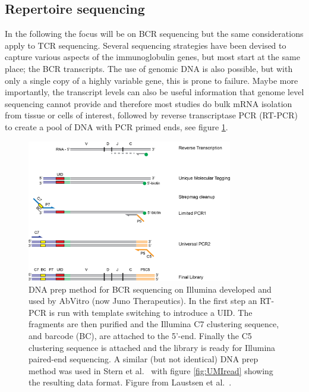 \subsection{Repertoire sequencing}
In the following the focus will be on BCR sequencing but the same considerations apply to TCR sequencing.
Several sequencing strategies have been devised to capture various aspects of the immunoglobulin genes, but most start at the same place; the BCR transcripts.
The use of genomic DNA is also possible, but with only a single copy of a highly variable gene, this is prone to failure.
Maybe more importantly, the transcript levels can also be useful information that genome level sequencing cannot provide and therefore most studies do bulk mRNA isolation from tissue or cells of interest, followed by reverse transcriptase PCR (RT-PCR) to create a pool of DNA with PCR primed ends, see figure \ref{fig:BCR_RTPCR}.

\begin{figure}[ht]
    \centering
    \includegraphics[width=0.8\textwidth]{figures/BCR_RTPCR_AbVitro.png}
    \caption{
        \label{fig:BCR_RTPCR}
        DNA prep method for BCR sequencing on Illumina developed and used by AbVitro (now Juno Therapeutics).
        In the first step an RT-PCR is run with template switching to introduce a UID.
        The fragments are then purified and the Illumina C7 clustering sequence, and barcode (BC), are attached to the 5'-end.
        Finally the C5 clustering sequence is attached and the library is ready for Illumina paired-end sequencing.
        A similar (but not identical) DNA prep method was used in Stern et al.\ \cite{stern2014b} with figure \ref{fig:UMIread} showing the resulting data format.
        Figure from Laustsen et al.\ \cite{laustsen2017exploration}.
    }
\end{figure}

